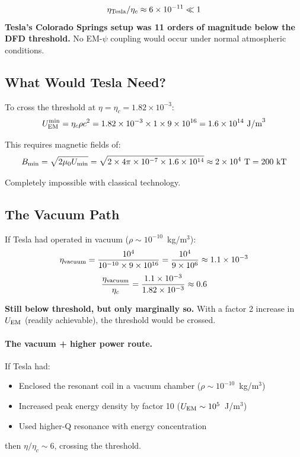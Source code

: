 \documentclass[12pt,a4paper]{article}
\begin{document}
\begin{tcolorbox}[colback=red!5!white, colframe=red!60!black,
  title=Tesla Colorado Springs: Below Threshold]
\begin{equation}
\eta_{\rm Tesla}/\eta_c \approx 6 \times 10^{-11} \ll 1
\end{equation}
\textbf{Tesla's Colorado Springs setup was 11 orders of magnitude below
the DFD threshold.}  No EM-$\psi$ coupling would occur under normal
atmospheric conditions.
\end{tcolorbox}

\subsection{What Would Tesla Need?}

To cross the threshold at $\eta = \eta_c = 1.82 \times 10^{-3}$:
\begin{equation}
U_{\rm EM}^{\rm min} = \eta_c \rho c^2 = 1.82 \times 10^{-3} \times 1 \times 9 \times 10^{16}
= 1.6 \times 10^{14}~\text{J/m}^3
\end{equation}

This requires magnetic fields of:
\begin{equation}
B_{\rm min} = \sqrt{2\mu_0 U_{\rm min}} = \sqrt{2 \times 4\pi \times 10^{-7} \times 1.6 \times 10^{14}}
\approx 2 \times 10^4~\text{T} = 200~\text{kT}
\end{equation}

Completely impossible with classical technology.

\subsection{The Vacuum Path}

If Tesla had operated in vacuum ($\rho \sim 10^{-10}$~kg/m$^3$):
\begin{equation}
\eta_{\rm vacuum} = \frac{10^4}{10^{-10} \times 9 \times 10^{16}} = \frac{10^4}{9 \times 10^6}
\approx 1.1 \times 10^{-3}
\end{equation}
\begin{equation}
\frac{\eta_{\rm vacuum}}{\eta_c} = \frac{1.1 \times 10^{-3}}{1.82 \times 10^{-3}} \approx 0.6
\end{equation}

\textbf{Still below threshold, but only marginally so.}  With a factor 2 increase
in $U_{\rm EM}$ (readily achievable), the threshold would be crossed.

\paragraph{The vacuum + higher power route.}
If Tesla had:
\begin{itemize}
\item Enclosed the resonant coil in a vacuum chamber ($\rho \sim 10^{-10}$~kg/m$^3$)
\item Increased peak energy density by factor 10 ($U_{\rm EM} \sim 10^5$~J/m$^3$)
\item Used higher-Q resonance with energy concentration
\end{itemize}
then $\eta/\eta_c \sim 6$, crossing the threshold.
\end{document}
